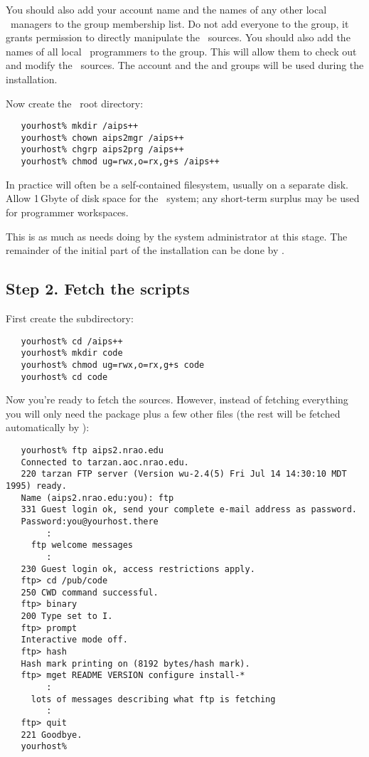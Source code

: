 \noindent
You should also add your account name and the names of any other local
\aipspp\ managers to the  group membership list.  Do not add
everyone to the  group, it grants permission to directly
manipulate the \rcs\ sources.  You should also add the names of all local
\aipspp\ programmers to the  group.  This will allow them to
check out and modify the \aipspp\ sources.  The  account and the
 and  groups will be used during the installation.

Now create the \aipspp\ root directory:

\begin{verbatim}
   yourhost% mkdir /aips++
   yourhost% chown aips2mgr /aips++
   yourhost% chgrp aips2prg /aips++
   yourhost% chmod ug=rwx,o=rx,g+s /aips++
\end{verbatim}

\noindent
In practice  will often be a self-contained filesystem, usually
on a separate disk.  Allow 1\,Gbyte of disk space for the \aipspp\ system; any
short-term surplus may be used for programmer workspaces.

This is as much as needs doing by the system administrator at this stage.  The
remainder of the initial part of the installation can be done by
.

\subsection*{Step 2. Fetch the  scripts}

First create the  subdirectory:

\begin{verbatim}
   yourhost% cd /aips++
   yourhost% mkdir code
   yourhost% chmod ug=rwx,o=rx,g+s code
   yourhost% cd code
\end{verbatim}

\noindent
Now you're ready to fetch the sources.  However, instead of fetching
everything you will only need the  package plus a few other
files (the rest will be fetched automatically by ):

\begin{verbatim}
   yourhost% ftp aips2.nrao.edu
   Connected to tarzan.aoc.nrao.edu.
   220 tarzan FTP server (Version wu-2.4(5) Fri Jul 14 14:30:10 MDT 1995) ready.
   Name (aips2.nrao.edu:you): ftp
   331 Guest login ok, send your complete e-mail address as password.
   Password:you@yourhost.there
        :
     ftp welcome messages
        :
   230 Guest login ok, access restrictions apply.
   ftp> cd /pub/code
   250 CWD command successful.
   ftp> binary
   200 Type set to I.
   ftp> prompt
   Interactive mode off.
   ftp> hash
   Hash mark printing on (8192 bytes/hash mark).
   ftp> mget README VERSION configure install-*
        :
     lots of messages describing what ftp is fetching
        :
   ftp> quit
   221 Goodbye.
   yourhost%
\end{verbatim}

